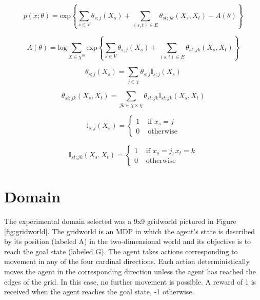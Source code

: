 \documentclass{article} %
\begin{document}
\begin{equation}
\label{eqn:exp-family}
p(x;\theta)
=
\textrm{exp}\left\{\sum_{s \in V}\theta_{s;j}(X_s) + \sum_{(s,t) \in E} \theta_{st;jk}(X_s,X_t) - A(\theta)\right\}
\end{equation}

\begin{equation}
\label{eqn:normalization}
A(\theta)
=
\textrm{log} \sum_{X \in \chi^m} \textrm{exp}\left\{\sum_{s \in V}\theta_{s;j}(X_s) + \sum_{(s,t) \in E} \theta_{st;jk}(X_s,X_t)\right\}
\end{equation}

\noindent\begin{minipage}{.4\linewidth}
\begin{equation}
\label{eqn:exp-family}
\theta_{s;j}(X_s) = \sum_{j \in \chi} \theta_{s;j} \mathbb{I}_{s;j}(X_s)
\end{equation}
\end{minipage}%
\begin{minipage}{.6\linewidth}
\begin{equation}
\label{eqn:exp-family}
\theta_{st;jk}(X_s,X_t) = \sum_{jk \in \chi \times \chi} \theta_{st;jk} \mathbb{I}_{st;jk}(X_s,X_t)
\end{equation}
\end{minipage}

\noindent\begin{minipage}{.4\linewidth}
\begin{equation}
\label{eqn:node-ind}
\mathbb{I}_{s;j}(X_s) = \left\{ \begin{array}{rl}
 1 &\mbox{ if $x_s = j$} \\
 0 &\mbox{ otherwise}
\end{array} \right.
\end{equation}
\end{minipage}%
\begin{minipage}{.6\linewidth}
\begin{equation}
\label{eqn:edge-ind}
\mathbb{I}_{st;jk}(X_s,X_t) = \left\{ \begin{array}{rr}
 1 &\mbox{ if $x_s = j, x_t = k$} \\
 0 &\mbox{ otherwise}
\end{array} \right.
\end{equation}
\end{minipage}

\section{Domain}
The experimental domain selected was a 9x9 gridworld pictured in Figure \ref{fig:gridworld}. The gridworld is an MDP in which the agent's state is described by its position (labeled A) in the two-dimensional world and its objective is to reach the goal state (labeled G). The agent takes actions corresponding to movement in any of the four cardinal directions. Each action deterministically moves the agent in the corresponding direction unless the agent has reached the edges of the grid. In this case, no further movement is possible. A reward of 1 is received when the agent reaches the goal state, -1 otherwise.
\end{document}
